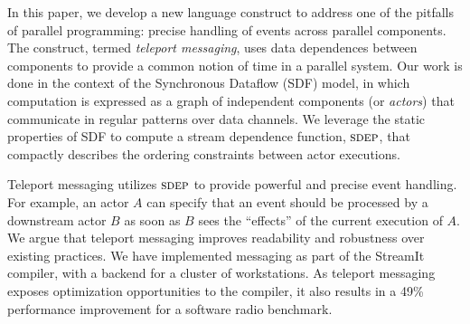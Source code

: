In this paper, we develop a new language construct to address one of
the pitfalls of parallel programming: precise handling of events
across parallel components.  The construct, termed {\it teleport
messaging}, uses data dependences between components to provide a
common notion of time in a parallel system.  Our work is done in the
context of the Synchronous Dataflow (SDF) model, in which computation
is expressed as a graph of independent components (or {\it actors})
that communicate in regular patterns over data channels.  We leverage
the static properties of SDF to compute a stream dependence function,
$\textsc{sdep}$, that compactly describes the ordering constraints between
actor executions.

Teleport messaging utilizes $\textsc{sdep}$ to provide powerful and precise
event handling.  For example, an actor $A$ can specify that an event
should be processed by a downstream actor $B$ as soon as $B$ sees the
``effects'' of the current execution of $A$.  We argue that teleport
messaging improves readability and robustness over existing practices.
We have implemented messaging as part of the StreamIt compiler, with a
backend for a cluster of workstations.  As teleport messaging exposes
optimization opportunities to the compiler, it also results in a 49\%
performance improvement for a software radio benchmark.
